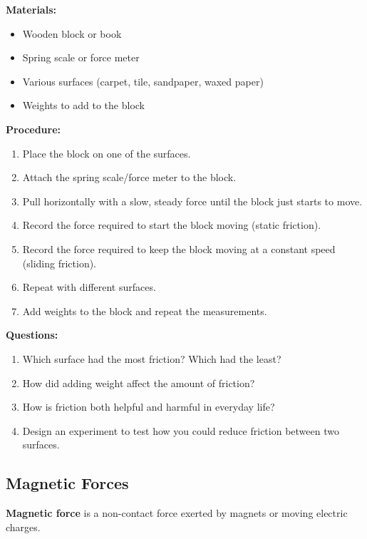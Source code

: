 \documentclass[justified,notoc]{tufte-book}
\newcommand{\keyword}[1]{\textbf{#1}\marginnote{\textbf{#1}: }}
\newenvironment{investigation}[1]{%
    \begin{tcolorbox}[colback=info!10,colframe=info,title=\textbf{Investigation: #1}]
}{%
    \end{tcolorbox}
}
\begin{document}
\begin{investigation}{Investigating Friction}
\textbf{Materials:}
\begin{itemize}
    \item Wooden block or book
    \item Spring scale or force meter
    \item Various surfaces (carpet, tile, sandpaper, waxed paper)
    \item Weights to add to the block
\end{itemize}

\textbf{Procedure:}
\begin{enumerate}
    \item Place the block on one of the surfaces.
    \item Attach the spring scale/force meter to the block.
    \item Pull horizontally with a slow, steady force until the block just starts to move.
    \item Record the force required to start the block moving (static friction).
    \item Record the force required to keep the block moving at a constant speed (sliding friction).
    \item Repeat with different surfaces.
    \item Add weights to the block and repeat the measurements.
\end{enumerate}

\textbf{Questions:}
\begin{enumerate}
    \item Which surface had the most friction? Which had the least?
    \item How did adding weight affect the amount of friction?
    \item How is friction both helpful and harmful in everyday life?
    \item Design an experiment to test how you could reduce friction between two surfaces.
\end{enumerate}
\end{investigation}

\subsection{Magnetic Forces}

\keyword{Magnetic force} is a non-contact force exerted by magnets or moving electric charges.
\end{document}
